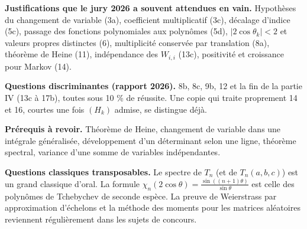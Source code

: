 \documentclass[11pt,a4paper]{article}
\begin{document}
\textbf{Justifications que le jury 2026 a souvent attendues en vain.} Hypothèses du changement de variable (3a), coefficient multiplicatif (3c), décalage d'indice (5c), passage des fonctions polynomiales aux polynômes (5d), \(|2\cos\theta_k|<2\) et valeurs propres distinctes (6), multiplicité conservée par translation (8a), théorème de Heine (11), indépendance des \(W_{i,i}\) (13c), positivité et croissance pour Markov (14).

\textbf{Questions discriminantes (rapport 2026).} 8b, 8c, 9b, 12 et la fin de la partie IV (13c à 17b), toutes sous 10 \% de réussite. Une copie qui traite proprement 14 et 16, courtes une fois \((H_k)\) admise, se distingue déjà.

\textbf{Prérequis à revoir.} Théorème de Heine, changement de variable dans une intégrale généralisée, développement d'un déterminant selon une ligne, théorème spectral, variance d'une somme de variables indépendantes.

\textbf{Questions classiques transposables.} Le spectre de \(T_n\) (et de \(T_n(a,b,c)\)) est un grand classique d'oral. La formule \(\chi_n(2\cos\theta)=\frac{\sin((n+1)\theta)}{\sin\theta}\) est celle des polynômes de Tchebychev de seconde espèce. La preuve de Weierstrass par approximation d'échelons et la méthode des moments pour les matrices aléatoires reviennent régulièrement dans les sujets de concours.
\end{document}
